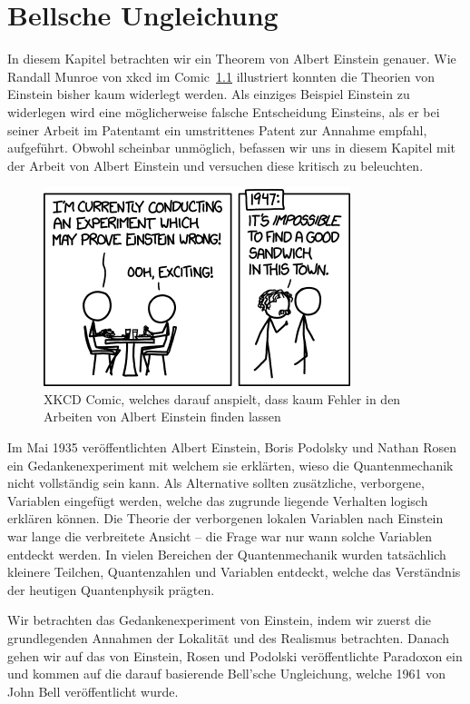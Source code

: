 \chapter{Bellsche Ungleichung\label{chapter:bell}}
\begin{refsection}

In diesem Kapitel betrachten wir ein Theorem von Albert Einstein genauer.
Wie Randall Munroe von xkcd im
Comic~\ref{fig:bell:xkcd_einstein} illustriert konnten die Theorien von
Einstein bisher kaum widerlegt werden.
Als einziges Beispiel Einstein zu widerlegen wird eine m\"oglicherweise falsche
Entscheidung Einsteins, als er bei seiner Arbeit im Patentamt ein umstrittenes
Patent zur Annahme empfahl, aufgef\"uhrt.
Obwohl scheinbar unm\"oglich, befassen wir uns in diesem Kapitel mit der Arbeit
von Albert Einstein und versuchen diese kritisch zu beleuchten.

\begin{figure}[b]
    \centering
    \includegraphics[width=0.5\linewidth]{bell/images/xkcd_einstein.png}
    \caption{XKCD Comic, welches darauf anspielt, dass kaum Fehler 
    in den Arbeiten von Albert Einstein finden lassen \cite{Bell:XkcdComic}}
    \label{fig:bell:xkcd_einstein}
\end{figure}


Im Mai 1935 ver\"offentlichten Albert Einstein, Boris Podolsky und
Nathan Rosen ein Gedankenexperiment mit welchem sie erkl\"arten, wieso
die Quantenmechanik nicht vollst\"andig sein kann. Als Alternative
sollten zus\"atzliche, verborgene, Variablen eingef\"ugt werden, welche
das zugrunde liegende Verhalten logisch erkl\"aren k\"onnen.
Die Theorie der verborgenen lokalen Variablen nach Einstein war lange
die verbreitete Ansicht -- die Frage war nur wann solche Variablen
entdeckt werden. In vielen Bereichen der Quantenmechanik wurden tats\"achlich
kleinere Teilchen, Quantenzahlen und Variablen entdeckt, welche das
Verst\"andnis der heutigen Quantenphysik pr\"agten.

Wir betrachten das Gedankenexperiment von Einstein, indem wir zuerst die
grundlegenden Annahmen der Lokalit\"at und des Realismus betrachten. Danach
gehen wir auf das von Einstein, Rosen und Podolski ver\"offentlichte Paradoxon
ein und kommen auf die darauf basierende Bell'sche Ungleichung, welche
1961 von John Bell ver\"offentlicht wurde.


\end{refsection}
